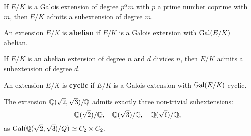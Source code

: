 \begin{exercise}
    If $E/K$ is a Galois extension of degree $p^\alpha m$ with
    $p$ a prime number coprime with $m$, then $E/K$ admits 
    a subextension of degree $m$. 
\end{exercise}

\begin{definition}
    An extension $E/K$ is \textbf{abelian} if $E/K$ is a Galois extension
    with $\operatorname{Gal}(E/K)$ abelian.
\end{definition}

\begin{exercise}
    If $E/K$ is an abelian extension of degree $n$ and $d$ divides
    $n$, then $E/K$ admits a subextension of degree $d$. 
\end{exercise}

\begin{definition}
    An extension $E/K$ is \textbf{cyclic} if $E/K$ is 
    a Galois extension with $\operatorname{Gal}(E/K)$ cyclic. 
\end{definition}

\begin{example}
    The extension $\mathbb{Q}(\sqrt{2},\sqrt{3})/\mathbb{Q}$ admits
    exactly three non-trivial subextensions: 
    \[
    \mathbb{Q}(\sqrt{2})/\mathbb{Q},
    \quad
    \mathbb{Q}(\sqrt{3})/\mathbb{Q},
    \quad 
    \mathbb{Q}(\sqrt{6})/\mathbb{Q},
    \]
    as $\operatorname{Gal}(\mathbb{Q}(\sqrt{2},\sqrt{3})/Q)\simeq C_2\times C_2$. 
\end{example}

